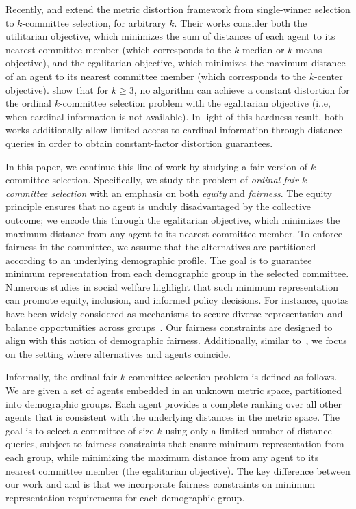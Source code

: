 Recently, \citet{pulyassary2025constant} and \citet{burkhardt2024low} extend the metric distortion framework from single-winner selection to $k$-committee selection, for arbitrary $k$. 
Their works consider both the utilitarian objective, which minimizes the sum of distances of each agent to its nearest committee member (which corresponds to the $k$-median or $k$-means objective), and the egalitarian objective, which minimizes the maximum distance of an agent to its nearest committee member (which corresponds to the $k$-center objective).
\citet{burkhardt2024low} show that for $k \geq 3$, no algorithm can achieve a constant distortion for the ordinal $k$-committee selection problem with the egalitarian objective (i..e, when cardinal information is not available).
In light of this hardness result, both works additionally allow limited access to cardinal information through distance queries in order to obtain constant-factor distortion guarantees.



In this paper, we continue this line of work by studying a fair version of $k$-committee selection. 
Specifically, we study the problem of \emph{ordinal fair $k$-committee selection} with an emphasis on both \emph{equity} and \emph{fairness}. 
The equity principle ensures that no agent is unduly disadvantaged by the collective outcome; we encode this through the egalitarian objective, which minimizes the maximum distance from any agent to its nearest committee member.
To enforce fairness in the committee, we assume that the alternatives are partitioned according to an underlying demographic profile. The goal is to guarantee minimum representation from each demographic group in the selected committee. Numerous studies in social welfare highlight that such minimum representation can promote equity, inclusion, and informed policy decisions. For instance, quotas have been widely considered as mechanisms to secure diverse representation and balance opportunities across groups~\cite{barnes2020gender, croissant2019ethnic}. Our fairness constraints are designed to align with this notion of demographic fairness. Additionally, similar to~\cite{burkhardt2024low,cembrano2025metric}, we focus on the setting where alternatives and agents coincide.


Informally, the ordinal fair $k$-committee selection problem is defined as follows. 
We are given a set of agents embedded in an unknown metric space, partitioned into demographic groups. 
Each agent provides a complete ranking over all other agents that is consistent with the underlying distances in the metric space.
The goal is to select a committee of size $k$ using only a limited number of distance queries, subject to fairness constraints that ensure minimum representation from each group, while minimizing the maximum distance from any agent to its nearest committee member (the egalitarian objective).
The key difference between our work and \citet{pulyassary2025constant} and \citet{burkhardt2024low} is that we incorporate fairness constraints on minimum representation requirements for each demographic group.

